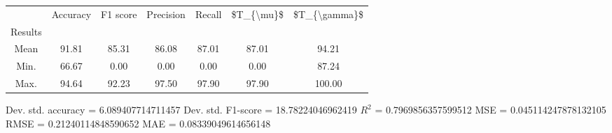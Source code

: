 \begin{tabular}{|c|c|c|c|c|c|c|}
\toprule
{} &  Accuracy &  F1 score &  Precision &  Recall &  \$T\_\{\textbackslash mu\}\$ &  \$T\_\{\textbackslash gamma\}\$ \\
Results &           &           &            &         &            &               \\
\hline
Mean    &     91.81 &     85.31 &      86.08 &   87.01 &      87.01 &         94.21 \\
Min.    &     66.67 &      0.00 &       0.00 &    0.00 &       0.00 &         87.24 \\
Max.    &     94.64 &     92.23 &      97.50 &   97.90 &      97.90 &        100.00 \\
\bottomrule
\end{tabular}

 Dev. std. accuracy = 6.089407714711457
 Dev. std. F1-score = 18.78224046962419
 $R^2$ = 0.7969856357599512
 MSE = 0.045114247878132105
 RMSE = 0.21240114848590652
 MAE = 0.08339049614656148